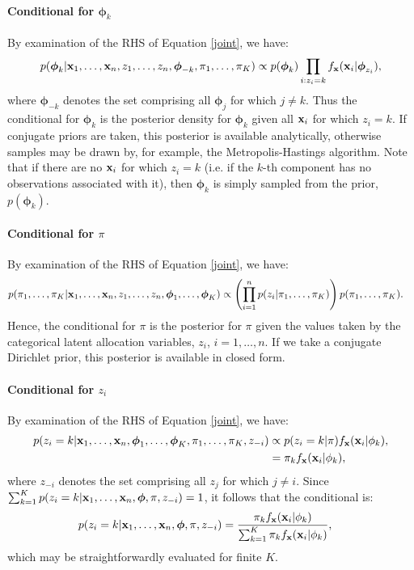 \documentclass[12pt]{article}
\begin{document}
\paragraph{Conditional for $\boldsymbol{\phi}_k$}
  By examination of the RHS of Equation \ref{joint}, we have:
\begin{equation}
p(\boldsymbol{\phi}_{k}| {\bf x}_1,\ldots, {\bf x}_n,z_1, \ldots, z_n, \boldsymbol{\phi}_{-k}, \pi_1, \ldots, \pi_K) \propto p(\boldsymbol{\phi}_k) \prod_{i: z_i = k} f_{\bf x}({\bf x}_i | \boldsymbol{\phi}_{z_i}),\label{postparm}
\end{equation} 
where $\boldsymbol{\phi}_{-k}$ denotes the set comprising all $\boldsymbol{\phi}_{j}$ for which $j\ne k$.  Thus the conditional for $\boldsymbol{\phi}_k$ is the posterior density for $\boldsymbol{\phi}_k$ given all ${\bf x}_i$ for which $z_i = k$.  If conjugate priors are taken, this posterior is available analytically, otherwise samples may be drawn by, for example, the Metropolis-Hastings algorithm.
Note that if there are no ${\bf x}_i$ for which $z_i = k$ (i.e. if the $k$-th component has no observations associated with it), then $\boldsymbol{\phi}_{k}$ is simply sampled from the prior, $p(\boldsymbol{\phi}_k)$.     

\paragraph{Conditional for $\pi$}
  By examination of the RHS of Equation \ref{joint}, we have:
\begin{align}
p(\pi_1, \ldots, \pi_K| {\bf x}_1,\ldots, {\bf x}_n,z_1, \ldots, z_n, \boldsymbol{\phi}_1, \ldots, \boldsymbol{\phi}_K) &\propto \left(\prod_{i=1}^n p(z_i | \pi_1, \ldots, \pi_K)\right)p(\pi_1, \ldots, \pi_K).
\end{align}
Hence, the conditional for $\pi$ is the posterior for $\pi$ given the values taken by the categorical latent allocation variables, $z_i$, $i = 1, \ldots, n$.  If we take a conjugate Dirichlet prior, this posterior is available in closed form.  



\paragraph{Conditional for $z_i$}
  By examination of the RHS of Equation \ref{joint}, we have:
\begin{align}
p(z_i = k| {\bf x}_1,\ldots, {\bf x}_n,\boldsymbol{\phi}_1, \ldots, \boldsymbol{\phi}_K, \pi_1, \ldots, \pi_K, z_{-i}) &\propto p(z_i=k|\pi) f_{\bf x}({\bf x}_i | \phi_{k}),\label{cicond1}\\
&= \pi_k  f_{\bf x}({\bf x}_i | \phi_{k}),
\end{align}
where $z_{-i}$ denotes the set comprising all $z_{j}$ for which $j\ne i$.  Since $\sum_{k = 1}^K p(z_i = k| {\bf x}_1,\ldots, {\bf x}_n,\boldsymbol{\phi}, \pi, z_{-i}) = 1$, it follows that the conditional is:  
\begin{align}
p(z_i = k| {\bf x}_1,\ldots, {\bf x}_n,\boldsymbol{\phi}, \pi, z_{-i}) &= \frac{\pi_k  f_{\bf x}({\bf x}_i | \phi_{k})}{\sum_{k=1}^K \pi_k  f_{\bf x}({\bf x}_i | \phi_{k})},
\end{align}
which may be straightforwardly evaluated for finite $K$.
\end{document}
